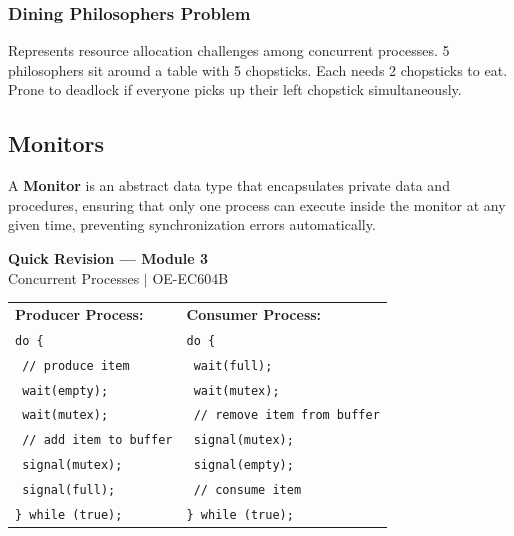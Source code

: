 \documentclass[12pt,a4paper]{article}
\begin{document}
\subsubsection{Dining Philosophers Problem}
Represents resource allocation challenges among concurrent processes. 5 philosophers sit around a table with 5 chopsticks. Each needs 2 chopsticks to eat. Prone to deadlock if everyone picks up their left chopstick simultaneously.

\subsection{Monitors}
A \textbf{Monitor} is an abstract data type that encapsulates private data and procedures, ensuring that only one process can execute inside the monitor at any given time, preventing synchronization errors automatically.

\newpage
\begin{center}
  {\large\bfseries\color{myred} Quick Revision --- Module 3}\\[3pt]
  {\small\color{mydark} Concurrent Processes $|$ OE-EC604B}
\end{center}
\noindent{\color{myred}\rule{\linewidth}{1.2pt}}
\vspace{4pt}

\begin{tcolorbox}[formulabox, title={\textbf{Producer-Consumer Semaphore Code}}]
\begin{tabularx}{\linewidth}{X X}
\textbf{Producer Process:} & \textbf{Consumer Process:} \\
\texttt{do \{} & \texttt{do \{} \\
\texttt{  // produce item} & \texttt{  wait(full);} \\
\texttt{  wait(empty);} & \texttt{  wait(mutex);} \\
\texttt{  wait(mutex);} & \texttt{  // remove item from buffer} \\
\texttt{  // add item to buffer} & \texttt{  signal(mutex);} \\
\texttt{  signal(mutex);} & \texttt{  signal(empty);} \\
\texttt{  signal(full);} & \texttt{  // consume item} \\
\texttt{\} while (true);} & \texttt{\} while (true);}
\end{tabularx}
\end{tcolorbox}
\end{document}
